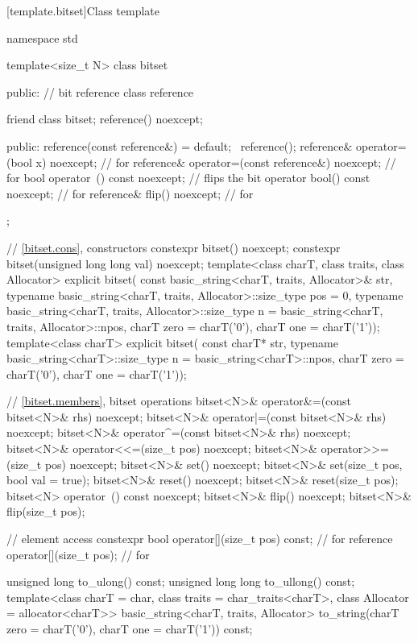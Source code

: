 [template.bitset]{Class template }%
%
\begin{codeblock}
namespace std {
  template<size_t N> class bitset {
  public:
    // bit reference
    class reference {
      friend class bitset;
      reference() noexcept;

    public:
      reference(const reference&) = default;
      ~reference();
      reference& operator=(bool x) noexcept;            // for 
      reference& operator=(const reference&) noexcept;  // for 
      bool operator~() const noexcept;                  // flips the bit
      operator bool() const noexcept;                   // for 
      reference& flip() noexcept;                       // for 
    };

    // \ref{bitset.cons}, constructors
    constexpr bitset() noexcept;
    constexpr bitset(unsigned long long val) noexcept;
    template<class charT, class traits, class Allocator>
      explicit bitset(
        const basic_string<charT, traits, Allocator>& str,
        typename basic_string<charT, traits, Allocator>::size_type pos = 0,
        typename basic_string<charT, traits, Allocator>::size_type n
          = basic_string<charT, traits, Allocator>::npos,
        charT zero = charT('0'),
        charT one = charT('1'));
    template<class charT>
      explicit bitset(
        const charT* str,
        typename basic_string<charT>::size_type n = basic_string<charT>::npos,
        charT zero = charT('0'),
        charT one = charT('1'));

    // \ref{bitset.members}, bitset operations
    bitset<N>& operator&=(const bitset<N>& rhs) noexcept;
    bitset<N>& operator|=(const bitset<N>& rhs) noexcept;
    bitset<N>& operator^=(const bitset<N>& rhs) noexcept;
    bitset<N>& operator<<=(size_t pos) noexcept;
    bitset<N>& operator>>=(size_t pos) noexcept;
    bitset<N>& set() noexcept;
    bitset<N>& set(size_t pos, bool val = true);
    bitset<N>& reset() noexcept;
    bitset<N>& reset(size_t pos);
    bitset<N>  operator~() const noexcept;
    bitset<N>& flip() noexcept;
    bitset<N>& flip(size_t pos);

    // element access
    constexpr bool operator[](size_t pos) const;        // for 
    reference operator[](size_t pos);                   // for 

    unsigned long to_ulong() const;
    unsigned long long to_ullong() const;
    template<class charT = char,
              class traits = char_traits<charT>,
              class Allocator = allocator<charT>>
      basic_string<charT, traits, Allocator>
        to_string(charT zero = charT('0'), charT one = charT('1')) const;

}}
\end{codeblock}
